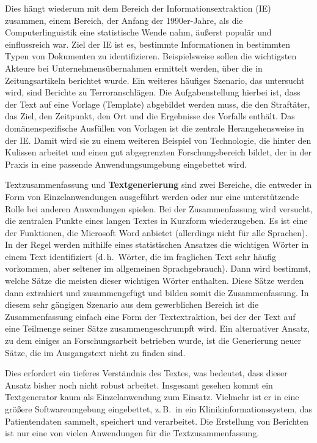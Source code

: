 \documentclass[]{../../metanetpaper}
\begin{document}
\begin{multicols}{2}

Dies hängt wiederum mit dem Bereich der Informationsextraktion (IE) zusammen, einem Bereich, der Anfang der 1990er-Jahre, als die Computerlinguistik eine statistische Wende nahm, äußerst populär und einflussreich war. Ziel der IE ist es, bestimmte Informationen in bestimmten Typen von Dokumenten zu identifizieren. Beispielsweise sollen die wichtigsten Akteure bei Unternehmensübernahmen ermittelt werden, über die in Zeitungsartikeln berichtet wurde. Ein weiteres häufiges Szenario, das untersucht wird, sind Berichte zu Terroranschlägen. Die Aufgabenstellung hierbei ist, dass der Text auf eine Vorlage (Template) abgebildet werden muss, die den Straftäter, das Ziel, den Zeitpunkt, den Ort und die Ergebnisse des Vorfalls enthält. Das domänenspezifische Ausfüllen von Vorlagen ist die zentrale Herangehensweise in der IE. Damit wird sie zu einem weiteren Beispiel von Technologie, die hinter den Kulissen arbeitet und einen gut abgegrenzten Forschungsbereich bildet, der in der Praxis in eine passende Anwendungsumgebung eingebettet wird.

Textzusammenfassung und \textbf{Textgenerierung} sind zwei Bereiche, die entweder in Form von Einzelanwendungen ausgeführt werden oder nur eine unterstützende Rolle bei anderen Anwendungen spielen. Bei der Zusammenfassung wird versucht, die zentralen Punkte eines langen Textes in Kurzform wiederzugeben. Es ist eine der Funktionen, die Microsoft Word anbietet (allerdings nicht für alle Sprachen). In der Regel werden mithilfe eines statistischen Ansatzes die wichtigen Wörter in einem Text identifiziert (d.\,h.~Wörter, die im fraglichen Text sehr häufig vorkommen, aber seltener im allgemeinen Sprachgebrauch). Dann wird bestimmt, welche Sätze die meisten dieser wichtigen Wörter enthalten. Diese Sätze werden dann extrahiert und zusammengefügt und bilden somit die Zusammenfassung. In diesem sehr gängigen Szenario aus dem gewerblichen Bereich ist die Zusammenfassung einfach eine Form der Textextraktion, bei der der Text auf eine Teilmenge seiner Sätze zusammengeschrumpft wird. Ein alternativer Ansatz, zu dem einiges an Forschungsarbeit betrieben wurde, ist die Generierung neuer Sätze, die im Ausgangstext nicht zu finden sind. 


Dies erfordert ein tieferes Verständnis des Textes, was bedeutet, dass dieser Ansatz bisher noch nicht robust arbeitet. Insgesamt gesehen kommt ein Textgenerator kaum als Einzelanwendung zum Einsatz. Vielmehr ist er in eine größere Softwareumgebung eingebettet, z.\,B.~in ein Klinikinformationssystem, das Patientendaten sammelt, speichert und verarbeitet. Die Erstellung von Berichten ist nur eine von vielen Anwendungen für die Textzusammenfassung. 


\end{multicols}
\end{document}
